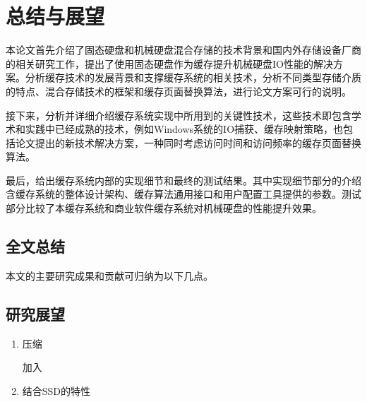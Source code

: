 \chapter{总结与展望}
\label{cha:conclusions}

本论文首先介绍了固态硬盘和机械硬盘混合存储的技术背景和国内外存储设备厂商的相关研究工作，提出了使用固态硬盘作为缓存提升机械硬盘IO性能的解决方案。分析缓存技术的发展背景和支撑缓存系统的相关技术，分析不同类型存储介质的特点、混合存储技术的框架和缓存页面替换算法，进行论文方案可行的说明。

接下来，分析并详细介绍缓存系统实现中所用到的关键性技术，这些技术即包含学术和实践中已经成熟的技术，例如Windows系统的IO捕获、缓存映射策略，也包括论文提出的新技术解决方案，一种同时考虑访问时间和访问频率的缓存页面替换算法。

最后，给出缓存系统内部的实现细节和最终的测试结果。其中实现细节部分的介绍含缓存系统的整体设计架构、缓存算法通用接口和用户配置工具提供的参数。测试部分比较了本缓存系统和商业软件缓存系统对机械硬盘的性能提升效果。

\section{全文总结}
\label{sec:thesis_conclusion}

本文的主要研究成果和贡献可归纳为以下几点。
\begin{enumerate}


\end{enumerate}

\section{研究展望}
\label{sec:thesis_expectation}

\begin{enumerate}

\item 压缩

加入

\item 结合SSD的特性

\end{enumerate}
